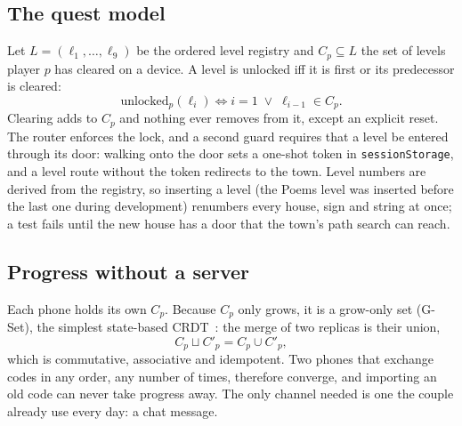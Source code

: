 \documentclass[sigconf,nonacm]{acmart}
\newcommand{\code}[1]{\texttt{\small #1}}
\begin{document}
\subsection{The quest model}
Let $L = (\ell_1,\dots,\ell_9)$ be the ordered level registry and $C_p \subseteq L$ the set of
levels player $p$ has cleared on a device. A level is unlocked iff it is first or its predecessor
is cleared:
\begin{equation}
  \mathrm{unlocked}_p(\ell_i) \iff i = 1 \;\lor\; \ell_{i-1} \in C_p .
\end{equation}
Clearing adds to $C_p$ and nothing ever removes from it, except an explicit reset. The router
enforces the lock, and a second guard requires that a level be entered through its door: walking
onto the door sets a one-shot token in \code{sessionStorage}, and a level route without the token
redirects to the town. Level numbers are derived from the registry, so inserting a level (the
Poems level was inserted before the last one during development) renumbers every house, sign and
string at once; a test fails until the new house has a door that the town's path search can reach.

\subsection{Progress without a server}
Each phone holds its own $C_p$. Because $C_p$ only grows, it is a grow-only set (G-Set), the
simplest state-based CRDT~\cite{shapiro2011crdt}: the merge of two replicas is their union,
\begin{equation}
  C_p \sqcup C'_p = C_p \cup C'_p ,
\end{equation}
which is commutative, associative and idempotent. Two phones that exchange codes in any order, any
number of times, therefore converge, and importing an old code can never take progress away. The
only channel needed is one the couple already use every day: a chat message.
\end{document}
